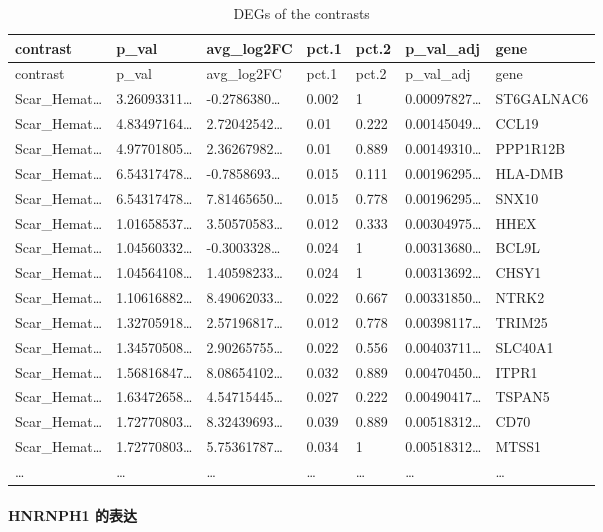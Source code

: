 \documentclass[
]{article}
\begin{document}
\begin{longtable}[]{@{}lllllll@{}}
\caption{\label{tab:DEGs-of-the-contrasts}DEGs of the contrasts}\tabularnewline
\toprule
contrast & p\_val & avg\_log2FC & pct.1 & pct.2 & p\_val\_adj & gene\tabularnewline
\midrule
\endfirsthead
\toprule
contrast & p\_val & avg\_log2FC & pct.1 & pct.2 & p\_val\_adj & gene\tabularnewline
\midrule
\endhead
Scar\_Hemat\ldots{} & 3.26093311\ldots{} & -0.2786380\ldots{} & 0.002 & 1 & 0.00097827\ldots{} & ST6GALNAC6\tabularnewline
Scar\_Hemat\ldots{} & 4.83497164\ldots{} & 2.72042542\ldots{} & 0.01 & 0.222 & 0.00145049\ldots{} & CCL19\tabularnewline
Scar\_Hemat\ldots{} & 4.97701805\ldots{} & 2.36267982\ldots{} & 0.01 & 0.889 & 0.00149310\ldots{} & PPP1R12B\tabularnewline
Scar\_Hemat\ldots{} & 6.54317478\ldots{} & -0.7858693\ldots{} & 0.015 & 0.111 & 0.00196295\ldots{} & HLA-DMB\tabularnewline
Scar\_Hemat\ldots{} & 6.54317478\ldots{} & 7.81465650\ldots{} & 0.015 & 0.778 & 0.00196295\ldots{} & SNX10\tabularnewline
Scar\_Hemat\ldots{} & 1.01658537\ldots{} & 3.50570583\ldots{} & 0.012 & 0.333 & 0.00304975\ldots{} & HHEX\tabularnewline
Scar\_Hemat\ldots{} & 1.04560332\ldots{} & -0.3003328\ldots{} & 0.024 & 1 & 0.00313680\ldots{} & BCL9L\tabularnewline
Scar\_Hemat\ldots{} & 1.04564108\ldots{} & 1.40598233\ldots{} & 0.024 & 1 & 0.00313692\ldots{} & CHSY1\tabularnewline
Scar\_Hemat\ldots{} & 1.10616882\ldots{} & 8.49062033\ldots{} & 0.022 & 0.667 & 0.00331850\ldots{} & NTRK2\tabularnewline
Scar\_Hemat\ldots{} & 1.32705918\ldots{} & 2.57196817\ldots{} & 0.012 & 0.778 & 0.00398117\ldots{} & TRIM25\tabularnewline
Scar\_Hemat\ldots{} & 1.34570508\ldots{} & 2.90265755\ldots{} & 0.022 & 0.556 & 0.00403711\ldots{} & SLC40A1\tabularnewline
Scar\_Hemat\ldots{} & 1.56816847\ldots{} & 8.08654102\ldots{} & 0.032 & 0.889 & 0.00470450\ldots{} & ITPR1\tabularnewline
Scar\_Hemat\ldots{} & 1.63472658\ldots{} & 4.54715445\ldots{} & 0.027 & 0.222 & 0.00490417\ldots{} & TSPAN5\tabularnewline
Scar\_Hemat\ldots{} & 1.72770803\ldots{} & 8.32439693\ldots{} & 0.039 & 0.889 & 0.00518312\ldots{} & CD70\tabularnewline
Scar\_Hemat\ldots{} & 1.72770803\ldots{} & 5.75361787\ldots{} & 0.034 & 1 & 0.00518312\ldots{} & MTSS1\tabularnewline
\ldots{} & \ldots{} & \ldots{} & \ldots{} & \ldots{} & \ldots{} & \ldots{}\tabularnewline
\bottomrule
\end{longtable}

\hypertarget{hnrnph1-ux7684ux8868ux8fbe}{%
\paragraph{HNRNPH1 的表达}\label{hnrnph1-ux7684ux8868ux8fbe}}
\end{document}
